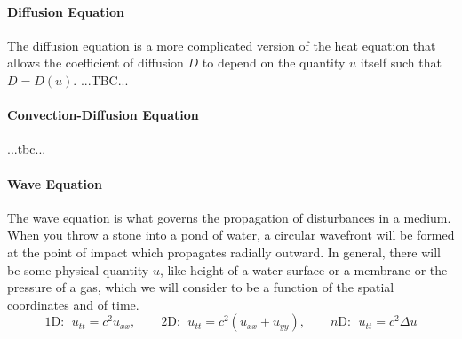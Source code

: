 \paragraph{Diffusion Equation} 
The diffusion equation is a more complicated version of the heat equation that allows the coefficient of diffusion $D$ to depend on the quantity $u$ itself such that $D = D(u)$. ...TBC...




\paragraph{Convection-Diffusion Equation} ...tbc...



\paragraph{Wave Equation}
The wave equation is what governs the propagation of disturbances in a medium. When you throw a stone into a pond of water, a circular wavefront will be formed at the point of impact which propagates radially outward. In general, there will be some physical quantity $u$, like height of a water surface or a membrane or the pressure of a gas, which we will consider to be a function of the spatial coordinates and of time.
\begin{equation}
1\text{D: } \; u_{tt} = c^2 u_{xx} , \qquad 
2\text{D: } \; u_{tt} = c^2 (u_{xx} + u_{yy}), \qquad 
n\text{D: } \; u_{tt} = c^2 \Delta u
\end{equation}





